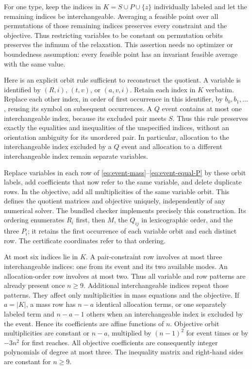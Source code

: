 For one type, keep the indices in $K=S\cup P\cup\{z\}$ individually
labeled and let the remaining indices be interchangeable. Averaging a
feasible point over all permutations of those remaining indices preserves
every constraint and the objective. Thus restricting variables to be
constant on permutation orbits preserves the infimum of the relaxation.
This assertion needs no optimizer or boundedness assumption: every feasible
point has an invariant feasible average with the same value.

Here is an explicit orbit rule sufficient to reconstruct the quotient.
A variable is identified by $(R,i)$, $(t,v)$, or $(a,v,i)$. Retain each
index in $K$ verbatim. Replace each other index, in order of first occurrence
in this identifier, by $b_0,b_1,\ldots$, reusing its symbol on subsequent
occurrences. A $Q$ event contains at most one interchangeable index,
because its excluded pair meets $S$. Thus this rule preserves exactly
the equalities and inequalities of the unspecified indices, without an
orientation ambiguity for its unordered pair. In particular, allocation
to the interchangeable index excluded by a $Q$ event and allocation to a
different interchangeable index remain separate variables.

Replace variables in each row of
\eqref{eq:event-mass}--\eqref{eq:event-equal-P} by these orbit labels,
add coefficients that now refer to the same variable, and delete duplicate
rows. In the objective, add all multiplicities of the same variable orbit.
This defines the quotient matrices and objective uniquely, independently
of any numerical solver. The bundled checker implements precisely this
construction. Its ordering enumerates $R_i$ first, then $M$, the $Q_{ij}$
in lexicographic order, and the three $P_i$; it retains the first occurrence
of each variable orbit and each distinct row. The certificate coordinates
refer to that ordering.

At most six indices lie in $K$. A pair-constraint row involves at most
three interchangeable indices: one from its event and its two available
modes. An allocation-order row involves at most two. Thus all variable and
row patterns are already present once $n\ge9$. Additional interchangeable
indices repeat those patterns. They affect only multiplicities in mass
equations and the objective. If $a=|K|$, a mass row has $n-a$ identical
allocation terms, or one separately labeled term and $n-a-1$ others when
an interchangeable index is excluded by the event. Hence its coefficients
are affine functions of $n$. Objective orbit multiplicities are constant
or $n-a$, multiplied by $(n-1)^2$ for event times or by $-3n^2$ for
first reaches. All objective coefficients are consequently integer
polynomials of degree at most three. The inequality matrix and right-hand
sides are constant for $n\ge9$.

